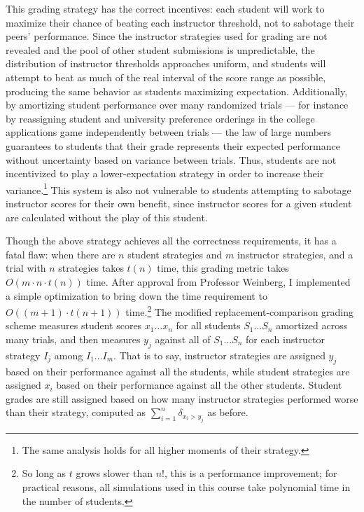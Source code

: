 \documentclass[pageno]{jpaper}
\begin{document}
This grading strategy has the correct incentives: each student will work to maximize their chance of beating each instructor threshold, not to sabotage their peers' performance.
Since the instructor strategies used for grading are not revealed and the pool of other student submissions is unpredictable, the distribution of instructor thresholds approaches uniform, and students will attempt to beat as much of the real interval of the score range as possible, producing the same behavior as students maximizing expectation.
Additionally, by amortizing student performance over many randomized trials --- for instance by reassigning student and university preference orderings in the college applications game independently between trials --- the law of large numbers guarantees to students that their grade represents their expected performance without uncertainty based on variance between trials.
Thus, students are not incentivized to play a lower-expectation strategy in order to increase their variance.\footnote{The same analysis holds for all higher moments of their strategy.}
This system is also not vulnerable to students attempting to sabotage instructor scores for their own benefit, since instructor scores for a given student are calculated without the play of this student.

Though the above strategy achieves all the correctness requirements, it has a fatal flaw: when there are $n$ student strategies and $m$ instructor strategies, and a trial with $n$ strategies takes $t(n)$ time, this grading metric takes $O(m \cdot n \cdot t(n))$ time.
After approval from Professor Weinberg, I implemented a simple optimization to bring down the time requirement to $O((m+1) \cdot t(n+1))$ time.\footnote{So long as $t$ grows slower than $n! $, this is a performance improvement; for practical reasons, all simulations used in this course take polynomial time in the number of students.}
The modified replacement-comparison grading scheme measures student scores $x_1 \ldots x_n$ for all students $S_1 \ldots S_n$ amortized across many trials, and then measures $y_j$ against all of $S_1 \ldots S_n$ for each instructor strategy $I_j$ among $I_1 \ldots I_m$.
That is to say, instructor strategies are assigned $y_j$ based on their performance against all the students, while student strategies are assigned $x_i$ based on their performance against all the other students.
Student grades are still assigned based on how many instructor strategies performed worse than their strategy, computed as $\sum\limits_{i=1}^n \delta_{x_i > y_j}$ as before.
\end{document}
